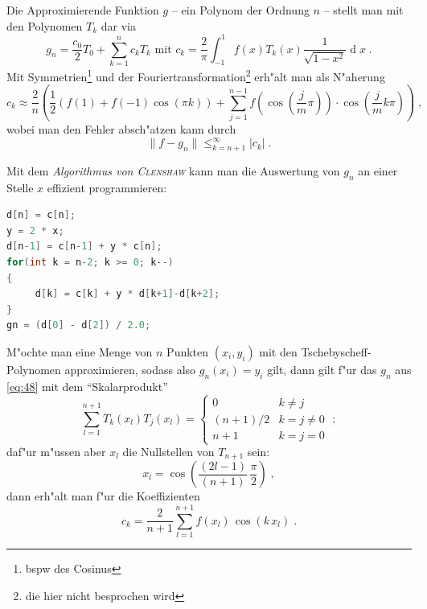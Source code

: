 \documentclass[a4paper]{book}
\newcommand{\abs}{\bigskip \noindent}
\newcommand{\diff}{\ensuremath{\operatorname d}}
\begin{document}
Die Approximierende Funktion $g$ -- ein Polynom der Ordnung $n$ --
stellt man mit den Polynomen $T_k$ dar via
\begin{equation}
\label{eq:48}
  g_n = \frac{c_0}{2}T_0 + \sum_{k=1}^n c_k T_k \text{ mit } c_k =
  \frac{2}{\pi} \int_{-1}^1 f(x) T_k(x) \frac{1}{\sqrt{1-x^2}} \diff x \;.
\end{equation}
Mit Symmetrien\footnote{bspw des Cosinus} und der
Fouriertransformation\footnote{die hier nicht besprochen wird} erh"alt
man als N"aherung
\begin{equation}
  \label{eq:49}
  c_k \approx \frac{2}{n} \left ( 
    \frac{1}{2}\left ( f(1) + f(-1)\cos(\pi k) \right )
    +
    \sum_{j=1}^{n-1} f(\cos \left(\frac{j}{m} \pi\right) ) \cdot
    \cos(\frac{j}{m}k\pi) 
 \right ) \;,
\end{equation}
wobei man den Fehler absch"atzen kann durch
\begin{equation*}
  \|f-g_n\| \leq _{k = n+1}^\infty |c_k| \;.
\end{equation*}

Mit dem \emph{Algorithmus von \textsc{Clenshaw}} kann man die
Auswertung von $g_n$ an einer Stelle $x$ effizient programmieren:
\begin{lstlisting}[language=c++]
d[n] = c[n];
y = 2 * x;
d[n-1] = c[n-1] + y * c[n];
for(int k = n-2; k >= 0; k--)
{
     d[k] = c[k] + y * d[k+1]-d[k+2];
}
gn = (d[0] - d[2]) / 2.0;
\end{lstlisting}



\abs
M"ochte man eine Menge von $n$ Punkten $(x_i,y_i)$ mit den
Tschebyscheff-Polynomen approximieren, sodass also $g_n(x_i) = y_i$
gilt, dann gilt f"ur das $g_n$ aus \eqref{eq:48} mit dem
"`Skalarprodukt"'
\begin{equation*}
  \sum_{l=1}^{n+1} T_k(x_l) T_j(x_l) = 
  \begin{cases}
    0 & k \neq j \\
    (n+1)/2 & k = j \neq 0 \\
    n+1 & k=j=0 
  \end{cases} \;;
\end{equation*}
daf"ur m"ussen aber $x_l$ die Nullstellen von $T_{n+1}$ sein:
\begin{equation*}
  x_l = \cos( \frac{(2l-1)}{(n+1)} \, \frac{\pi}{2} ) \;,
\end{equation*}
dann erh"alt man f"ur die Koeffizienten 
\begin{equation}
  \label{eq:50}
  c_k = \frac{2}{n+1} \sum_{l=1}^{n+1} f( x_l ) \, \cos( k \, x_l ) \;.
\end{equation}
\end{document}
